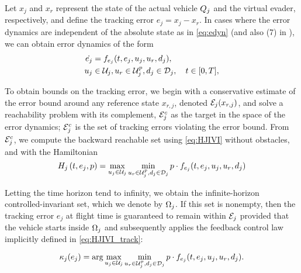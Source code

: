
Let $x_j$ and $x_r$ represent the state of the actual vehicle $Q_j$ and the virtual evader, respectively, and define the tracking error $e_j=x_j-x_r$. In cases where the error dynamics are independent of the absolute state as in \eqref{eq:edyn} (and also (7) in \cite{Mitchell05}), we can obtain error dynamics of the form
\begin{equation}
\label{eq:edyn} %
\begin{aligned}
\dot{e_j} &= f_{e_j}(t, e_j, u_j, u_r,d_j), \\
u_j &\in \cset_j, u_r\in\cset^p_j, d_j \in \dset_j, \quad t \in [0, T],
\end{aligned}
\end{equation}

To obtain bounds on the tracking error, we begin with a conservative estimate of the error bound around any reference state $x_{r,j}$, denoted $\mathcal{E}_j(x_{r,j})$, and solve a reachability problem with its complement, $\mathcal{E}_j^c$ as the target in the space of the error dynamics; $\mathcal{E}_j^c$ is the set of tracking errors violating the error bound. From $\mathcal{E}_j^c$, we compute the backward reachable set using \eqref{eq:HJIVI} without obstacles, and with the Hamiltonian
\vspace{-1em}
\begin{equation}
\label{eq:HJIVI_track}
H_j\left(t, e_j, p\right) = \max_{u_j \in \mathcal{U}_j} \min_{u_r \in\mathcal{U}^p_j, d_j \in \mathcal{D}_j} p \cdot f_{e_j}(t, e_j, u_j, u_r,d_j)
\end{equation}

Letting the time horizon tend to infinity, we obtain the infinite-horizon controlled-invariant set, which we denote by $\Omega_j$. If this set is nonempty, then the tracking error $e_j$ at flight time is guaranteed to remain within $\mathcal{E}_j$ provided that the vehicle starts inside $\Omega_j$ and subsequently applies the feedback control law implicitly defined in \eqref{eq:HJIVI_track}:

\vspace{-1.5em}
\begin{equation}
\label{eq:robust_tracking_law}
\kappa_j(e_j) = \arg\max_{u_j \in \mathcal{U}_j} \min_{u_r \in\mathcal{U}^p_j, d_j \in \mathcal{D}_j} p \cdot f_{e_j}(t,e_j,u_j,u_r,d_j).
\end{equation}

